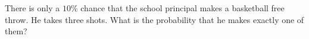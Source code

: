 There is only a $10\%$ chance that the school principal makes a basketball free throw. He takes three shots. What is the probability that he makes exactly one of them?
